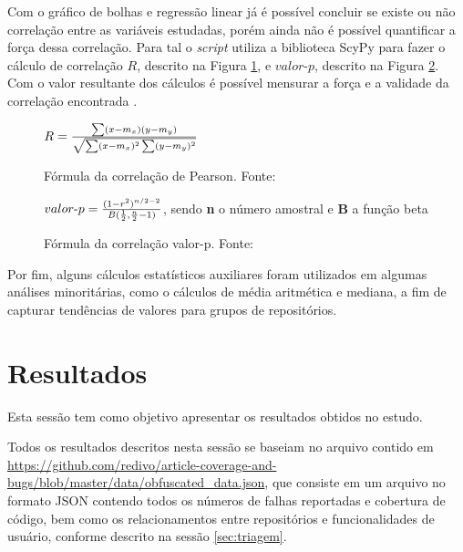 \documentclass[11.5pt]{article}
\begin{document}
Com o gráfico de bolhas e regressão linear já é possível concluir se existe ou não correlação entre
as variáveis estudadas, porém ainda não é possível quantificar a força dessa correlação.
Para tal o \textit{script} utiliza a biblioteca ScyPy
\cite{scipy} para fazer o cálculo de correlação $R$, descrito na Figura \ref{fig:formulaCorrelacao},
e $valor\mbox{-}p$, descrito na Figura \ref{fig:formulaValorP}.
Com o valor resultante dos cálculos é possível mensurar a força e a validade da correlação encontrada
\cite{openIntroStat}.

\begin{figure}[ht]
\caption{Fórmula da correlação de Pearson. Fonte: \cite{scipy}}
\label{fig:formulaCorrelacao}
\begin{center}
    $R = {\sum(x - m_x)(y - m_y) \over \sqrt{\sum(x - m_x)^2 \sum(y - m_y)^2}}$
\end{center}
\end{figure}

\begin{figure}[ht]
\caption{Fórmula da correlação valor-p. Fonte: \cite{scipy}}
\label{fig:formulaValorP}
\begin{center}
    $valor\mbox{-}p = { (1 - r^2)^{n/2-2} \over B({1 \over 2}, {n \over 2} - 1) }$,
    sendo \textbf{n} o número amostral e \textbf{B} a função beta
\end{center}
\end{figure}

Por fim, alguns cálculos estatísticos auxiliares foram utilizados em algumas análises minoritárias,
como o cálculos de média aritmética e mediana, a fim de capturar
tendências de valores para grupos de repositórios.




\section{Resultados} \label{sec:resultados}

Esta sessão tem como objetivo apresentar os resultados obtidos no estudo.

Todos os resultados descritos nesta sessão se baseiam no arquivo contido em
\url{https://github.com/redivo/article-coverage-and-bugs/blob/master/data/obfuscated_data.json},
que consiste em um arquivo no formato JSON contendo todos os números de
falhas reportadas e cobertura de código, bem como os relacionamentos entre repositórios e
funcionalidades de usuário, conforme descrito na sessão \ref{sec:triagem}.
\end{document}
